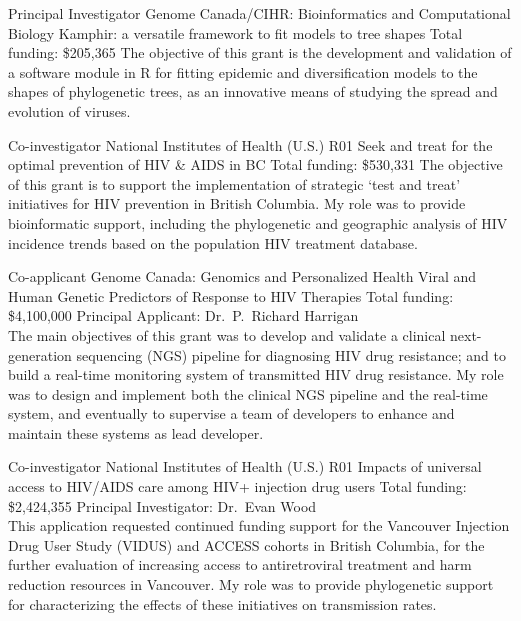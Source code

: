 \documentclass[11pt]{moderncv}
\begin{document}
{Principal Investigator}
{Genome Canada/CIHR: Bioinformatics and Computational Biology}
{Kamphir: a versatile framework to fit models to tree shapes}
{Total funding: \$205,365}
{
The objective of this grant is the development and validation of a software module in R for fitting epidemic and diversification models to the shapes of phylogenetic trees, as an innovative means of studying the spread and evolution of viruses.
}

{Co-investigator}
{National Institutes of Health (U.S.) R01}
{Seek and treat for the optimal prevention of HIV \& AIDS in BC}
{Total funding: \$530,331}
{
The objective of this grant is to support the implementation of strategic `test and treat' initiatives for HIV prevention in British Columbia.
My role was to provide bioinformatic support, including the phylogenetic and geographic analysis of HIV incidence trends based on the population HIV treatment database.\\
}


{Co-applicant}
{Genome Canada: Genomics and Personalized Health}
{Viral and Human Genetic Predictors of Response to HIV Therapies}
{Total funding: \$4,100,000}
{
Principal Applicant: Dr.~P.~Richard Harrigan\\
The main objectives of this grant was to develop and validate a clinical next-generation sequencing (NGS) pipeline for diagnosing HIV drug resistance;
and to build a real-time monitoring system of transmitted HIV drug resistance.
My role was to design and implement both the clinical NGS pipeline and the real-time system, and eventually to supervise a team of developers to enhance and maintain these systems as lead developer.
}

{Co-investigator}
{National Institutes of Health (U.S.) R01}
{Impacts of universal access to HIV/AIDS care among HIV+ injection drug users}
{Total funding: \$2,424,355}
{
Principal Investigator: Dr.~Evan Wood\\
This application requested continued funding support for the Vancouver Injection Drug User Study (VIDUS) and ACCESS cohorts in British Columbia, for the further evaluation of increasing access to antiretroviral treatment and harm reduction resources in Vancouver.
My role was to provide phylogenetic support for characterizing the effects of these initiatives on transmission rates.
}




\vspace{1em}
\end{document}
